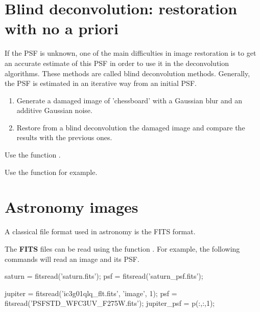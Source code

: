 \section{Blind deconvolution: restoration with no a priori}
If the PSF is unknown, one of the main difficulties in image restoration is to get an accurate estimate of this PSF in order to use it in the deconvolution algorithms. These methods are called blind deconvolution methods. Generally, the PSF is estimated in an iterative way from an initial PSF.

\begin{qbox}
\begin{enumerate}
	\item Generate a damaged image of 'chessboard' with a Gaussian blur and an additive Gaussian noise.
	\item Restore from a blind deconvolution the damaged image and compare the results with the previous ones.
\end{enumerate}

\end{qbox}
\begin{mcomment}
\begin{mremark}
 Use the function .
\end{mremark}
\end{mcomment}

\begin{phelp}
 Use the function  for example.
\end{phelp}


\section{Astronomy images}

A classical file format used in astronomy is the FITS format. 

\begin{mcomment}
\begin{mremark}
The \textbf{FITS} files can be read using the function . For example, the following commands will read an image and its PSF.

\begin{matlab}
saturn = fitsread('saturn.fits');
psf = fitsread('saturn_psf.fits');

jupiter = fitsread('ic3g01qlq_flt.fits', 'image', 1);
psf = fitsread('PSFSTD_WFC3UV_F275W.fits');
jupiter_psf = p(:,:,1); %
\end{matlab}

\end{mremark}
\end{mcomment}

